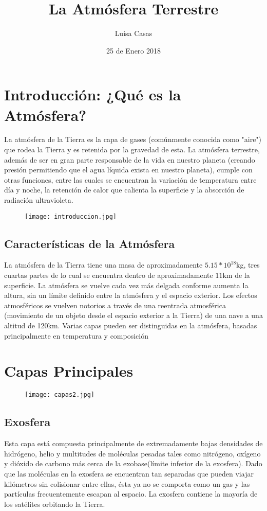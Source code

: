 \documentclass{article}
\title{La Atmósfera Terrestre}
\author{Luisa Casas}
\date {25 de Enero 2018}
\begin{document}
\maketitle
\section{Introducción: ¿Qué es la Atmósfera?}
La atmósfera de la Tierra es la capa de gases (comúnmente conocida como "aire") que rodea la Tierra y es retenida por la gravedad de esta.
La atmósfera terrestre, además de ser en gran parte responsable de la vida en nuestro planeta (creando presión permitiendo que el agua líquida exista en nuestro planeta), cumple con otras funciones, entre las cuales se encuentran la variación de temperatura entre día y noche, la retención de calor que calienta la superficie y la absorción de radiación ultravioleta.
\begin{figure}[h!]
    \texttt{[image: introduccion.jpg]}
\end{figure}
\subsection{Características de la Atmósfera}
La atmósfera de la Tierra tiene una masa de aproximadamente $5.15*10^{18}$kg, tres cuartas partes de lo cual se encuentra dentro de aproximadamente $11$km de la superficie. La atmósfera se vuelve cada vez más delgada conforme aumenta la altura, sin un límite definido entre la atmósfera y el espacio exterior. Los efectos atmosféricos se vuelven notorios a través de una reentrada atmosférica (movimiento de un objeto desde el espacio exterior a la Tierra) de una nave a una altitud de 120km. Varias capas pueden ser distinguidas en la atmósfera, basadas principalmente en temperatura y composición
\section{Capas Principales}
\begin{figure}[h!]
\texttt{[image: capas2.jpg]}
\end{figure}
\subsection{Exosfera}
Esta capa está compuesta principalmente de extremadamente bajas densidades de hidrógeno, helio y multitudes de moléculas pesadas tales como nitrógeno, oxígeno y dióxido de carbono más cerca de la exobase(límite inferior de la exosfera).  
Dado que las moléculas en la exosfera se encuentran tan separadas que pueden viajar kilómetros sin colisionar entre ellas, ésta ya no se comporta como un gas y las partículas frecuentemente escapan al espacio. 
La exosfera contiene la mayoría de los satélites orbitando la Tierra.
\end{document}
